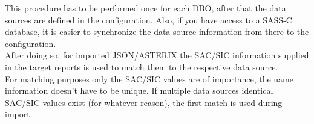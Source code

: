 This procedure  has to be performed once for each DBO, after that the data sources are defined in the configuration. Also, if you have access to a SASS-C database, it is easier to synchronize the data source information from there to the configuration. \\

After doing so, for imported JSON/ASTERIX the SAC/SIC information supplied in the target reports is used to match them to the respective data source. \\

For matching purposes only the SAC/SIC values are of importance, the name information doesn't have to be unique. If multiple data sources identical SAC/SIC values exist (for whatever reason), the first match is used during import. 
